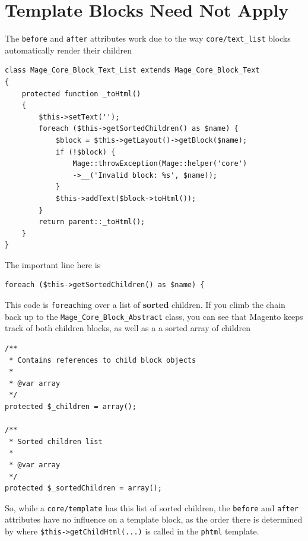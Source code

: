 \documentclass[oneside]{book}
\begin{document}
\section{Template Blocks Need Not Apply}

The \footnotesize\texttt{before} \normalsize  and \footnotesize\texttt{after} \normalsize  attributes work due to the way \footnotesize\texttt{core/text\_list} \normalsize  blocks automatically render their children

\begin{lstlisting}
class Mage_Core_Block_Text_List extends Mage_Core_Block_Text
{
    protected function _toHtml()
    {
        $this->setText('');
        foreach ($this->getSortedChildren() as $name) {
            $block = $this->getLayout()->getBlock($name);
            if (!$block) {
                Mage::throwException(Mage::helper('core')
                ->__('Invalid block: %s', $name));
            }
            $this->addText($block->toHtml());
        }
        return parent::_toHtml();
    }
}

\end{lstlisting}


The important line here is 

\begin{lstlisting}
foreach ($this->getSortedChildren() as $name) {

\end{lstlisting}


This code is \footnotesize\texttt{foreach}\normalsize ing over a list of \textbf{sorted} children.  If you climb the chain back up to the \footnotesize\texttt{Mage\_Core\_Block\_Abstract} \normalsize     class, you can see that Magento keeps track of both children blocks, as well as a a sorted array of children

\begin{lstlisting}
/**
 * Contains references to child block objects
 *
 * @var array
 */
protected $_children = array();

/**
 * Sorted children list
 *
 * @var array
 */
protected $_sortedChildren = array();

\end{lstlisting}


So, while a \footnotesize\texttt{core/template} \normalsize  has this list of sorted children, the \footnotesize\texttt{before} \normalsize  and \footnotesize\texttt{after} \normalsize  attributes have no influence on a template block, as the order there is determined by where \footnotesize\texttt{\$this-\textgreater getChildHtml(...)} \normalsize  is called in the \footnotesize\texttt{phtml} \normalsize  template.
\end{document}
